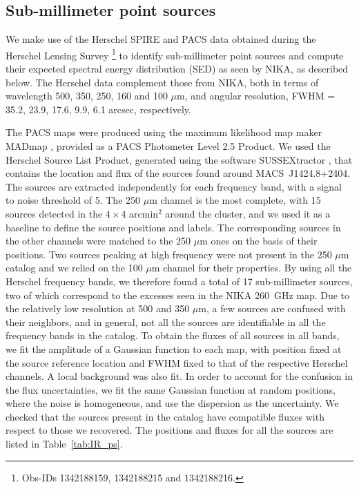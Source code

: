 \documentclass[twocolumn,traditabstract]{aa}
\begin{document}
\subsection{Sub-millimeter point sources}\label{sec:smmps}
We make use of the Herschel  SPIRE \citep{griffin2010} and PACS \citep{poglitsch2010} data obtained during the Herschel Lensing Survey \citep[HLS,][]{egami2010,rawle2012}\footnote{Obs-IDs 1342188159, 1342188215 and 1342188216.} to identify sub-millimeter point sources and compute their expected spectral energy distribution (SED) as seen by NIKA, as described below. The Herschel data complement those from  NIKA, both in terms of wavelength 500, 350, 250, 160 and 100 $\mu$m, and angular resolution, FWHM = 35.2, 23.9, 17.6, 9.9, 6.1 arcsec, respectively.

The PACS maps were produced using the maximum likelihood map maker MADmap \citep{cantalupo2010}, provided as a PACS Photometer Level 2.5 Product. We used the Herschel Source List Product, generated using the software SUSSEXtractor \citep{savage2007}, that contains the location and flux of the sources found around \mbox{MACS~J1424.8+2404}. The sources are extracted independently for each frequency band, with a signal to noise threshold of 5. The 250 $\mu$m channel is the most complete, with 15 sources detected in the $4 \times 4$ arcmin$^2$ around the cluster, and we used it as a baseline to define the source positions and labels. The corresponding sources in the other channels were matched to the 250 $\mu$m ones on the basis of their positions. Two sources peaking at high frequency were not present in the 250 $\mu$m catalog and we relied on the 100 $\mu$m channel for their properties. By using all the Herschel frequency bands, we therefore found a total of 17 sub-millimeter sources, two of which correspond to the excesses seen in the NIKA 260~GHz map. Due to the relatively low resolution at 500 and 350 $\mu$m, a few sources are confused with their neighbors, and in general, not all the sources are identifiable in all the frequency bands in the catalog. To obtain the fluxes of all sources in all bands, we fit the amplitude of a Gaussian function to each map, with position fixed at the source reference location and FWHM fixed to that of the respective Herschel channels. A local background was also fit. In order to account for the confusion in the flux uncertainties, we fit the same Gaussian function at random positions, where the noise is homogeneous, and use the dispersion as the uncertainty. We checked that the sources present in the catalog have compatible fluxes with respect to those we recovered. The positions and fluxes for all the sources are listed in Table~\ref{tab:IR_ps}.
\end{document}
